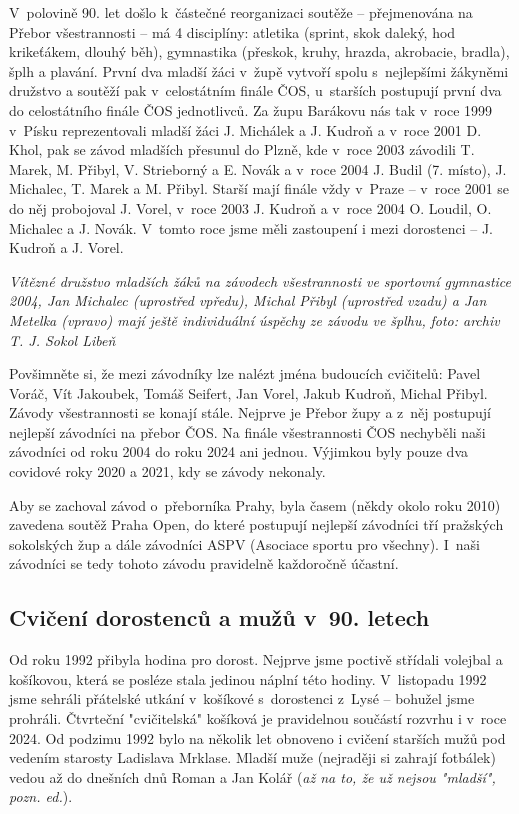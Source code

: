 \documentclass[a5paper, 12pt, twoside]{article}
\begin{document}
V~polovině 90. let došlo k~částečné reorganizaci soutěže -- přejmenována
na Přebor všestrannosti -- má 4 disciplíny: atletika (sprint, skok
daleký, hod krikeťákem, dlouhý běh), gymnastika (přeskok, kruhy, hrazda,
akrobacie, bradla), šplh a plavání. První dva mladší žáci v~župě vytvoří
spolu s~nejlepšími žákyněmi družstvo a soutěží pak v~celostátním finále
ČOS, u~starších postupují první dva do celostátního finále ČOS
jednotlivců. Za župu Barákovu nás tak v~roce 1999 v~Písku reprezentovali
mladší žáci J. Michálek a J. Kudroň a v~roce 2001 D. Khol, pak se závod
mladších přesunul do Plzně, kde v~roce 2003 závodili T. Marek, M.
Přibyl, V. Strieborný a E. Novák a v~roce 2004 J. Budil (7. místo), J.
Michalec, T. Marek a M. Přibyl. Starší mají finále vždy v~Praze --
v~roce 2001 se do něj probojoval J. Vorel, v~roce 2003 J. Kudroň a v~roce
2004 O. Loudil, O. Michalec a J. Novák. V~tomto roce jsme měli
zastoupení i mezi dorostenci -- J. Kudroň a J. Vorel.


\textit{Vítězné družstvo mladších žáků na závodech všestrannosti ve
sportovní gymnastice 2004, Jan Michalec (uprostřed vpředu), Michal
Přibyl (uprostřed vzadu) a Jan Metelka (vpravo) mají ještě individuální
úspěchy ze závodu ve šplhu,} \textit{foto: archiv T. J. Sokol Libeň}

Povšimněte si, že mezi závodníky lze nalézt jména budoucích cvičitelů:
Pavel Voráč, Vít Jakoubek, Tomáš Seifert, Jan Vorel, Jakub Kudroň,
Michal Přibyl. Závody všestrannosti se konají stále. Nejprve je Přebor
župy a z~něj postupují nejlepší závodníci na přebor ČOS. Na finále
všestrannosti ČOS nechyběli naši závodníci od roku 2004 do roku 2024 ani
jednou. Výjimkou byly pouze dva covidové roky 2020 a 2021, kdy se závody
nekonaly.

Aby se zachoval závod o~přeborníka Prahy, byla časem (někdy okolo roku
2010) zavedena soutěž Praha Open, do které postupují nejlepší závodníci
tří pražských sokolských žup a dále závodníci ASPV (Asociace sportu pro
všechny). I~naši závodníci se tedy tohoto závodu pravidelně každoročně
účastní.

\subsection{Cvičení dorostenců a mužů v~90.
letech}

Od roku 1992 přibyla hodina pro dorost. Nejprve jsme poctivě střídali
volejbal a košíkovou, která se posléze stala jedinou náplní této hodiny.
V~listopadu 1992 jsme sehráli přátelské utkání v~košíkové s~dorostenci
z~Lysé -- bohužel jsme prohráli. Čtvrteční "cvičitelská" košíková je
pravidelnou součástí rozvrhu i v~roce 2024. Od podzimu 1992 bylo na
několik let obnoveno i cvičení starších mužů pod vedením starosty
Ladislava Mrklase. Mladší muže (nejraději si zahrají fotbálek) vedou až
do dnešních dnů Roman a Jan Kolář (\textit{až na to, že už nejsou
"mladší", pozn. ed.}).
\end{document}
